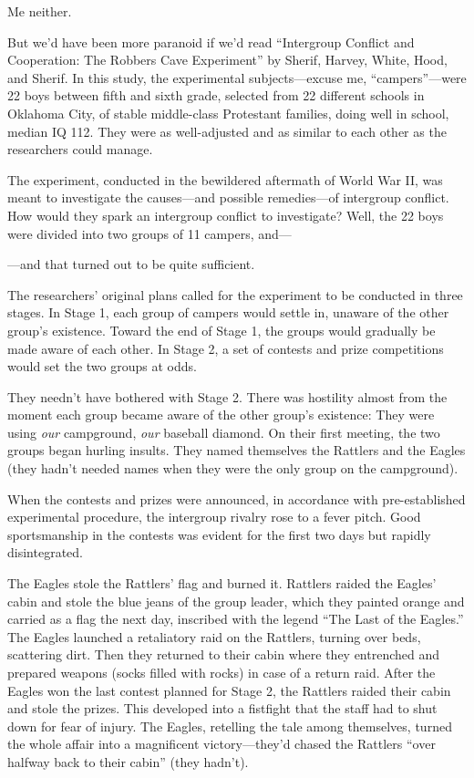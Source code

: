 {
 Me neither.}

{
 But we'd have been more paranoid if
we'd read ``Intergroup Conflict and
Cooperation: The Robbers Cave Experiment'' by Sherif,
Harvey, White, Hood, and Sherif. In this study, the
experimental subjects---excuse me,
``campers''---were 22 boys between
fifth and sixth grade, selected from 22 different schools in Oklahoma
City, of stable middle-class Protestant families, doing well in school,
median IQ 112. They were as well-adjusted and as similar to each other
as the researchers could manage.}

{
 The experiment, conducted in the bewildered aftermath of World War
II, was meant to investigate the causes---and possible remedies---of
intergroup conflict. How would they spark an intergroup conflict to
investigate? Well, the 22 boys were divided into two groups of 11
campers, and---}

{
 {}---and that turned out to be quite sufficient.}

{
 The researchers' original plans called for the
experiment to be conducted in three stages. In Stage 1, each group of
campers would settle in, unaware of the other group's
existence. Toward the end of Stage 1, the groups would gradually be
made aware of each other. In Stage 2, a set of contests and prize
competitions would set the two groups at odds.}

{
 They needn't have bothered with Stage 2. There was
hostility almost from the moment each group became aware of the other
group's existence: They were using \textit{our}
campground, \textit{our} baseball diamond. On their first meeting, the
two groups began hurling insults. They named themselves the Rattlers
and the Eagles (they hadn't needed names when they were
the only group on the campground).}

{
 When the contests and prizes were announced, in accordance with
pre-established experimental procedure, the intergroup rivalry rose to
a fever pitch. Good sportsmanship in the contests was evident for the
first two days but rapidly disintegrated.}

{
 The Eagles stole the Rattlers' flag and burned it.
Rattlers raided the Eagles' cabin and stole the blue
jeans of the group leader, which they painted orange and carried as a
flag the next day, inscribed with the legend ``The
Last of the Eagles.'' The Eagles launched a
retaliatory raid on the Rattlers, turning over beds, scattering dirt.
Then they returned to their cabin where they entrenched and prepared
weapons (socks filled with rocks) in case of a return raid. After the
Eagles won the last contest planned for Stage 2, the Rattlers raided
their cabin and stole the prizes. This developed into a fistfight that
the staff had to shut down for fear of injury. The Eagles, retelling
the tale among themselves, turned the whole affair into a magnificent
victory---they'd chased the Rattlers
``over halfway back to their cabin''
(they hadn't).}


